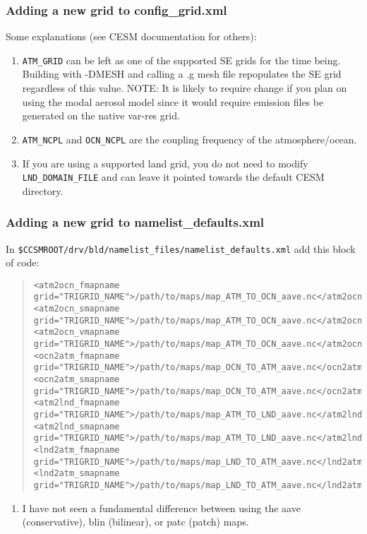 \documentclass{beamer}
\begin{document}
%
\begin{frame}[containsverbatim]
\frametitle{Adding a new grid to config\_grid.xml }
\begin{block}{}
Some explanations (see CESM documentation for others):
\begin{enumerate}
\item \verb|ATM_GRID| can be left as one of the supported SE grids for the time being. Building with -DMESH and calling a .g mesh file repopulates the SE grid regardless of this value. NOTE: It is likely to require change if you plan on using the modal aerosol model since it would require emission files be generated on the native var-res grid.
\item \verb|ATM_NCPL| and \verb|OCN_NCPL| are the coupling frequency of the atmosphere/ocean.
\item If you are using a supported land grid, you do not need to modify \verb|LND_DOMAIN_FILE| and can leave it pointed towards the default CESM directory.
\end{enumerate}
\end{block}
\end{frame}
%
\begin{frame}[containsverbatim]
\frametitle{Adding a new grid to namelist\_defaults.xml }
\begin{block}{}
In \verb|$CCSMROOT/drv/bld/namelist_files/namelist_defaults.xml| add this block of code:
\begin{quote}
\tiny
\begin{verbatim}
<atm2ocn_fmapname grid="TRIGRID_NAME">/path/to/maps/map_ATM_TO_OCN_aave.nc</atm2ocn_fmapname>
<atm2ocn_smapname grid="TRIGRID_NAME">/path/to/maps/map_ATM_TO_OCN_aave.nc</atm2ocn_smapname>
<atm2ocn_vmapname grid="TRIGRID_NAME">/path/to/maps/map_ATM_TO_OCN_aave.nc</atm2ocn_vmapname>
<ocn2atm_fmapname grid="TRIGRID_NAME">/path/to/maps/map_OCN_TO_ATM_aave.nc</ocn2atm_fmapname>
<ocn2atm_smapname grid="TRIGRID_NAME">/path/to/maps/map_OCN_TO_ATM_aave.nc</ocn2atm_smapname>
<atm2lnd_fmapname grid="TRIGRID_NAME">/path/to/maps/map_ATM_TO_LND_aave.nc</atm2lnd_fmapname>
<atm2lnd_smapname grid="TRIGRID_NAME">/path/to/maps/map_ATM_TO_LND_aave.nc</atm2lnd_smapname>
<lnd2atm_fmapname grid="TRIGRID_NAME">/path/to/maps/map_LND_TO_ATM_aave.nc</lnd2atm_fmapname>
<lnd2atm_smapname grid="TRIGRID_NAME">/path/to/maps/map_LND_TO_ATM_aave.nc</lnd2atm_smapname>
\end{verbatim}
\end{quote}
\end{block}
\begin{block}{}
\begin{enumerate}
\item I have not seen a fundamental difference between using the aave (conservative), blin (bilinear), or patc (patch) maps.
\end{enumerate}
\end{block}
\end{frame}
\end{document}
